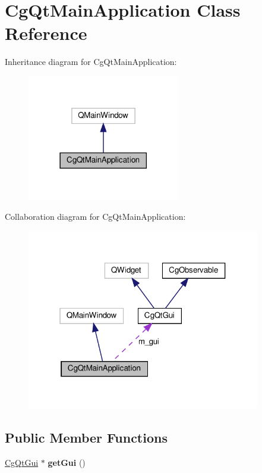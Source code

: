 \hypertarget{class_cg_qt_main_application}{}\section{Cg\+Qt\+Main\+Application Class Reference}
\label{class_cg_qt_main_application}


Inheritance diagram for Cg\+Qt\+Main\+Application\+:
\nopagebreak
\begin{figure}[H]
\begin{center}
\leavevmode
\includegraphics[width=189pt]{class_cg_qt_main_application__inherit__graph}
\end{center}
\end{figure}


Collaboration diagram for Cg\+Qt\+Main\+Application\+:
\nopagebreak
\begin{figure}[H]
\begin{center}
\leavevmode
\includegraphics[width=289pt]{class_cg_qt_main_application__coll__graph}
\end{center}
\end{figure}
\subsection*{Public Member Functions}
\begin{DoxyCompactItemize}
\item 
\mbox{\label{class_cg_qt_main_application_aa164405c144728b31da28df79c04444d}} 
\hyperlink{class_cg_qt_gui}{Cg\+Qt\+Gui} $\ast$ {\bfseries get\+Gui} ()
\end{DoxyCompactItemize}
